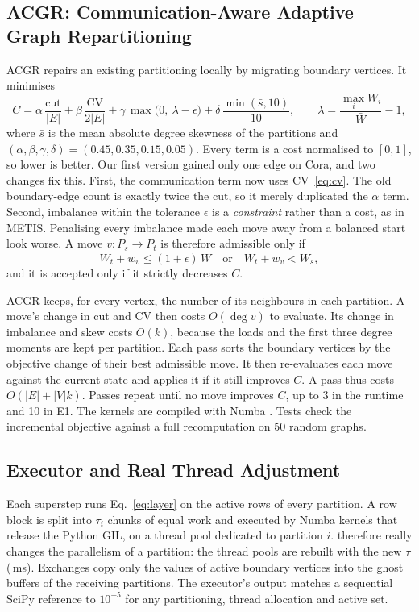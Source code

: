 \subsection{ACGR: Communication-Aware Adaptive Graph Repartitioning}\label{sec:acgr}
ACGR repairs an existing partitioning locally by migrating boundary vertices. It minimises
\begin{equation}\label{eq:acgr}
  C = \alpha\,\frac{\mathrm{cut}}{|E|} + \beta\,\frac{\mathrm{CV}}{2|E|}
    + \gamma\,\max\!\big(0,\ \lambda-\epsilon\big) + \delta\,\frac{\min(\bar s,10)}{10},
  \qquad \lambda=\frac{\max_i W_i}{\bar W}-1,
\end{equation}
where $\bar s$ is the mean absolute degree skewness of the partitions and
$(\alpha,\beta,\gamma,\delta)=(0.45,0.35,0.15,0.05)$. Every term is a cost normalised to $[0,1]$,
so lower is better. Our first version gained only one edge on Cora, and two changes fix this.
First, the communication term now uses CV~\eqref{eq:cv}. The old boundary-edge count is
exactly twice the cut, so it merely duplicated the $\alpha$ term. Second, imbalance within the
tolerance $\epsilon$ is a \emph{constraint} rather than a cost, as in METIS. Penalising every
imbalance made each move away from a balanced start look worse. A move $v: P_s\to P_t$ is
therefore admissible only if
\begin{equation}\label{eq:constraint}
  W_t + w_v \le (1+\epsilon)\,\bar W \quad\text{or}\quad W_t+w_v < W_s ,
\end{equation}
and it is accepted only if it strictly decreases $C$.

ACGR keeps, for every vertex, the number of its neighbours in each partition. A move's
change in cut and CV then costs $O(\deg v)$ to evaluate. Its change in imbalance and skew costs
$O(k)$, because the loads and the first three degree moments are kept per partition. Each pass
sorts the boundary vertices by the objective change of their best admissible move. It then
re-evaluates each move against the current state and applies it if it still improves $C$.
A pass thus costs $O(|E|+|V|k)$. Passes repeat until no move improves $C$, up to 3 in the
runtime and 10 in E1. The kernels are compiled with Numba \cite{lam2015numba}. Tests check
the incremental objective against a full recomputation on 50 random graphs.

\subsection{Executor and Real Thread Adjustment}\label{sec:executor}
Each superstep runs Eq.~\eqref{eq:layer} on the active rows of every partition. A row block
is split into $\tau_i$ chunks of equal work and executed by Numba kernels that release the
Python GIL, on a thread pool dedicated to partition $i$. \TA{} therefore really changes the
parallelism of a partition: the thread pools are rebuilt with the new $\tau$ (\ReconfMs\,ms).
Exchanges copy only the values of active boundary vertices into the ghost buffers of the
receiving partitions. The executor's output matches a sequential SciPy reference to
$10^{-5}$ for any partitioning, thread allocation and active set.
